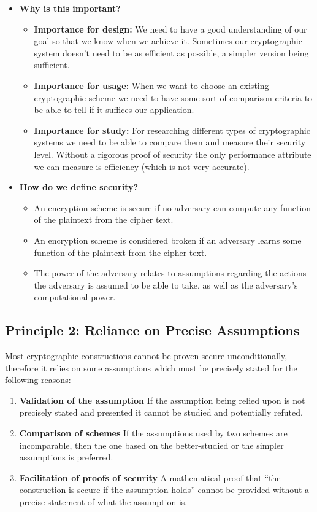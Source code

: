 \begin{itemize}
    \item \textbf{Why is this important?}
    \begin{itemize}
        \item \textbf{Importance for design:} We need to have a good understanding of our goal so that
we know when we achieve it. Sometimes our cryptographic system doesn't need to
be as efficient as possible, a simpler version being sufficient.
        \item \textbf{Importance for usage:} When we want to choose an existing cryptographic scheme
we need to have some sort of comparison criteria to be able to tell if it suffices our
application.
        \item \textbf{Importance for study:} For researching different types of cryptographic systems
we need to be able to compare them and measure their security level. Without
a rigorous proof of security the only performance attribute we can measure is
efficiency (which is not very accurate).
    \end{itemize}
    \item \textbf{How do we define security?}
    \begin{itemize}
        \item An encryption scheme is secure if no adversary can compute any function of the
plaintext from the cipher text.
        \item An encryption scheme is considered broken if an adversary learns some function of
the plaintext from the cipher text.
        \item The power of the adversary relates to assumptions regarding the actions the
adversary is assumed to be able to take, as well as the adversary's computational
power.
    \end{itemize}
\end{itemize}

\subsection{Principle 2: Reliance on Precise Assumptions}

Most cryptographic constructions cannot be proven secure unconditionally, therefore it relies on some assumptions which must be precisely stated for the following reasons:

\begin{enumerate}
\item \textbf{Validation of the assumption} If the assumption being relied upon is not precisely stated and presented it cannot be studied and potentially refuted.
\item \textbf{Comparison of schemes} If the assumptions used by two schemes are incomparable, then the one based on the better-studied or the simpler assumptions is preferred.
\item \textbf{Facilitation of proofs of security} A mathematical proof that ``the construction is secure if the assumption holds'' cannot be provided without a precise statement of what the assumption is.
\end{enumerate}


